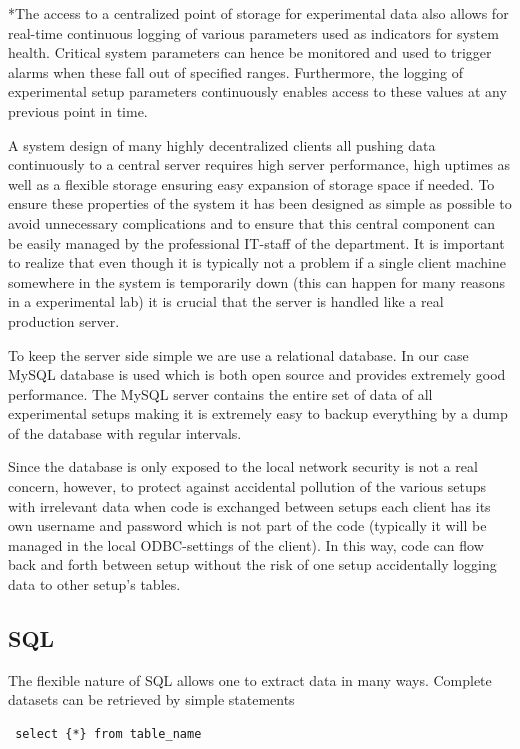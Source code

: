 *The access to a centralized point of storage for experimental data also allows
for real-time continuous logging of various parameters used as indicators for
system health. Critical system parameters can hence be monitored and used to
trigger alarms when these fall out of specified ranges. Furthermore, the
logging of experimental setup parameters continuously enables access to these
values at any previous point in time.

A system design of many highly decentralized clients all pushing data
continuously to a central server requires high server performance, high uptimes
as well as a flexible storage ensuring easy expansion of storage space if
needed. To ensure these properties of the system it has been designed as simple
as possible to avoid unnecessary complications and to ensure that this central
component can be easily managed by the professional IT-staff of the department.
It is important to realize that even though it is typically not a problem if a
single client machine somewhere in the system is temporarily down (this can
happen for many reasons in a experimental lab) it is crucial that the server is
handled like a real production server.

To keep the server side simple we are use a relational database. In our case
MySQL\cite{mysql} database is used which is both open source and provides
extremely good performance. The MySQL server contains the entire set of data
of all experimental setups making it is extremely easy to backup everything by
a dump of the database with regular intervals.

Since the database is only exposed to the local network security is not a real
concern, however, to protect against accidental pollution of the various setups
with irrelevant data when code is exchanged between setups each client has its
own username and password which is not part of the code (typically it will be
managed in the local ODBC-settings of the client). In this way, code can flow
back and forth between setup without the risk of one setup accidentally logging
data to other setup's tables.

\subsection{SQL} The flexible nature of SQL allows one to extract data in many
ways. Complete datasets can be retrieved by simple statements
\begin{verbatim}
 select {*} from table_name
\end{verbatim}

